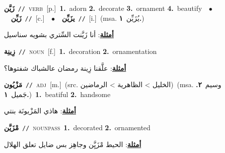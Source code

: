 \documentclass[10pt,a4paper,twoside]{article} %
\begin{document}
\begin{multicols}{2}
{\setlength\topsep{0pt}\textbf{\foreignlanguage{arabic}{زَيَّن}}\ {\color{gray}\texttt{//}\color{black}}\ \textsc{verb}\ [p.]\ \textbf{1.}~adorn  \textbf{2.}~decorate  \textbf{3.}~ornament  \textbf{4.}~beautify\ \ $\bullet$\ \ \setlength\topsep{0pt}\textbf{\foreignlanguage{arabic}{زَيِّن}}\ {\color{gray}\texttt{//}\color{black}}\ [c.]\ \ $\bullet$\ \ \setlength\topsep{0pt}\textbf{\foreignlanguage{arabic}{يزَيِّن}}\ {\color{gray}\texttt{//}\color{black}}\ [i.]\ \color{gray}(msa. \foreignlanguage{arabic}{يُزَيِّن}~\foreignlanguage{arabic}{\textbf{١.}})\color{black}\  \begin{flushright}\color{gray}\foreignlanguage{arabic}{\textbf{\underline{\foreignlanguage{arabic}{أمثلة}}}: أنا زَيَّنت السِّتري بشويه سناسيل}\end{flushright}\color{black}} \vspace{2mm}

{\setlength\topsep{0pt}\textbf{\foreignlanguage{arabic}{زِينِة}}\ {\color{gray}\texttt{//}\color{black}}\ \textsc{noun}\ [f.]\ \textbf{1.}~decoration  \textbf{2.}~ornamentation\  \begin{flushright}\color{gray}\foreignlanguage{arabic}{\textbf{\underline{\foreignlanguage{arabic}{أمثلة}}}: علَّقنا زِينة رمضان عالشباك شفتوها؟}\end{flushright}\color{black}} \vspace{2mm}

{\setlength\topsep{0pt}\textbf{\foreignlanguage{arabic}{مَزْيُون}}\ {\color{gray}\texttt{//}\color{black}}\ \textsc{adj}\ [m.]\ (src. \color{gray}\foreignlanguage{arabic}{الخليل > الظاهرية > الرماضين}\color{black})\ \color{gray}(msa. \foreignlanguage{arabic}{وسيم}~\foreignlanguage{arabic}{\textbf{٢.}}  \foreignlanguage{arabic}{جَميل}~\foreignlanguage{arabic}{\textbf{١.}})\color{black}\ \textbf{1.}~beatiful  \textbf{2.}~handsome\  \begin{flushright}\color{gray}\foreignlanguage{arabic}{\textbf{\underline{\foreignlanguage{arabic}{أمثلة}}}: هاذي المَزْيونَة بنتي}\end{flushright}\color{black}} \vspace{2mm}

{\setlength\topsep{0pt}\textbf{\foreignlanguage{arabic}{مْزَيَّن}}\ {\color{gray}\texttt{//}\color{black}}\ \textsc{noun\textunderscore pass}\ \textbf{1.}~decorated  \textbf{2.}~ornamented\  \begin{flushright}\color{gray}\foreignlanguage{arabic}{\textbf{\underline{\foreignlanguage{arabic}{أمثلة}}}: الحيط مْزَيَِّن وجاهِز بس ضايل تعلق الهلال}\end{flushright}\color{black}} \vspace{2mm}


\end{multicols}
\end{document}
